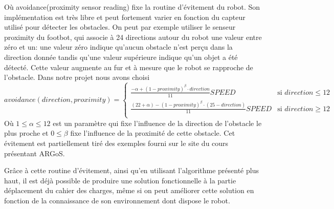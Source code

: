 \documentclass[a4paper]{report}
\begin{document}
Où avoidance(proximity sensor reading) fixe la routine d'évitement du robot. Son implémentation est très libre et peut fortement varier en fonction du capteur utilisé pour détecter les obstacles. On peut par exemple utiliser le senseur proximity du footbot, qui associe à 24 directions autour du robot une valeur entre zéro et un: une valeur zéro indique qu'aucun obstacle n'est perçu dans la direction donnée tandis qu'une valeur supérieure indique qu'un objet a été détecté. Cette valeur augmente au fur et à mesure que le robot se rapproche de l'obstacle.\cite{argosSite1} Dans notre projet nous avons choisi
\[avoidance(direction, proximity)=
  \begin{cases}
      \frac{-\alpha +(1-proximity)^{\beta}\cdot direction}{11}SPEED & \text{si }direction \leq 12\\
      \frac{(22+\alpha )-(1-proximity)^{\beta}\cdot (25-direction)}{11}SPEED & \text{si }direction \geq 12\\
  \end{cases}
\]
Où \(1 \leq \alpha \leq 12 \) est un paramètre qui fixe l'influence de la direction de l'obstacle le plus proche et \(0 \leq \beta \) fixe l'influence de la proximité de cette obstacle. Cet évitement est partiellement tiré des exemples fourni sur le site du cours présentant ARGoS.\cite{argosSite1}

Grâce à cette routine d'évitement, ainsi qu'en utilisant l'algorithme présenté plus haut, il est déjà possible de produire une solution fonctionnelle à la partie déplacement du cahier des charges, même si on peut améliorer cette solution en fonction de la connaissance de son environnement dont dispose le robot.
\end{document}
